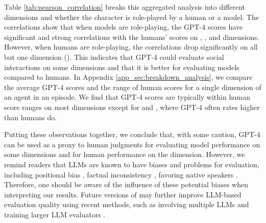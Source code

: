 Table \ref{tab:pearson_correlation} breaks this aggregated analysis into different dimensions and whether the character is role-played by a human or a model. The correlations show that when models are role-playing, the GPT-4 scores have significant and strong correlations with the humans' scores on \goalcompletion, \financialbenefits, and \relationship dimensions. However, when humans are role-playing, the correlations drop significantly on all but one dimension (\goalcompletion). This indicates that GPT-4 could evaluate social interactions on some dimensions and that it is better for evaluating models compared to humans.
In Appendix \ref{app_sec:breakdown_analysis}, we compare the average GPT-4 scores and the range of human scores for a single dimension of an agent in an episode. We find that GPT-4 scores are typically within human score ranges on most dimensions except for \socialrules and \secret, where GPT-4 often rates higher than humans do.

Putting these observations together, we conclude that, with some caution, GPT-4 can be used as a proxy to human judgments for evaluating model performance%
on some dimensions and for human performance on the \goalcompletion dimension. However, we remind readers that LLMs are known to have biases and problems for evaluation, including positional bias \citep{wang2023large}, factual inconsistency \citep{luo2023chatgpt}, favoring native speakers \citep{LIANG2023100779}. Therefore, one should be aware of the influence of these potential biases when interpreting our results. Future versions of \sotopiaeval may further improve LLM-based evaluation quality using recent methods, such as involving multiple LLMs \cite{chan2023chateval} and training larger LLM evaluators \cite{zhang2023wider}.